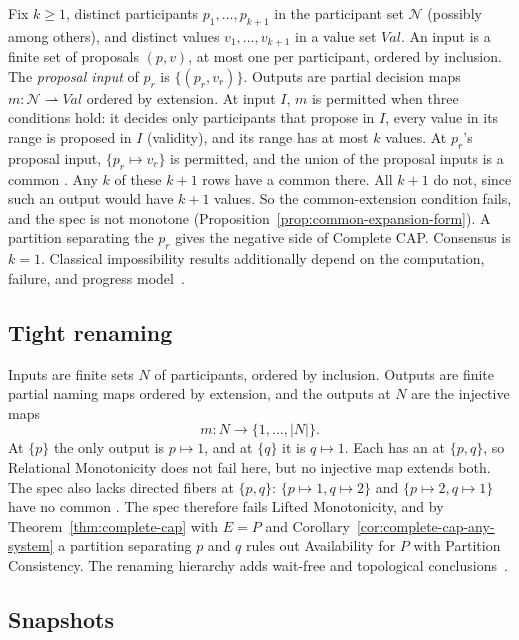 Fix $k\geq1$, distinct participants $p_1,\ldots,p_{k+1}$ in the participant set $\mathcal N$
(possibly among others), and distinct values $v_1,\ldots,v_{k+1}$ in a value
set $\mathit{Val}$.  An input is a finite set of proposals $(p,v)$, at most one
per participant, ordered by inclusion.  The \emph{proposal input} of $p_r$ is
$\{(p_r,v_r)\}$.  Outputs are partial decision maps
$m:\mathcal N\rightharpoonup\mathit{Val}$ ordered by extension.  At input $I$,
$m$ is permitted when three conditions hold: it decides only participants that
propose in $I$, every value in its range is proposed in $I$ (validity), and
its range has at most $k$ values.  At $p_r$'s proposal input,
$\{p_r\mapsto v_r\}$ is permitted, and the union of the proposal inputs is a
common \indesc.  Any $k$ of these $k+1$ rows have a common \outnoun there.
All $k+1$ do not, since such an output would have $k+1$ values.  So the
common-extension condition fails, and the spec is not monotone
(Proposition~\ref{prop:common-expansion-form}).  A partition separating the
$p_r$ gives the negative side of Complete CAP.  Consensus is $k=1$.  Classical impossibility results additionally depend on the
computation, failure, and progress model~\cite{saks2000set}.

\subsection{Tight renaming}

Inputs are finite sets $N$ of participants, ordered by inclusion.  Outputs are
finite partial naming maps ordered by extension, and the outputs at $N$ are
the injective maps
\begin{equation}
  m:N\longrightarrow\{1,\ldots,|N|\}.
  \label{eq:tight-renaming}
\end{equation}
At $\{p\}$ the only output is $p\mapsto1$, and at $\{q\}$ it is $q\mapsto1$.
Each has an \outnoun at $\{p,q\}$, so Relational Monotonicity does not fail
here, but no injective map extends both.  The spec also lacks directed
fibers at
$\{p,q\}$: $\{p\mapsto1,q\mapsto2\}$ and $\{p\mapsto2,q\mapsto1\}$ have no
common \outnoun.  The spec therefore fails Lifted Monotonicity, and
by Theorem~\ref{thm:complete-cap} with $E=P$ and Corollary~\ref{cor:complete-cap-any-system} a partition separating $p$ and $q$ rules out
Availability for $P$ with Partition Consistency.  The renaming hierarchy adds
wait-free and topological
conclusions~\cite{herlihy1991waitfree,herlihy1999topological}.

\subsection{Snapshots}

